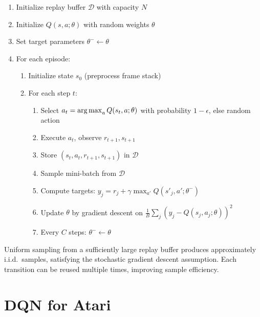 \begin{algorithme}[title=\textbf{DQN Algorithm}]
\begin{enumerate}
    \item Initialize replay buffer $\mathcal{D}$ with capacity $N$
    \item Initialize $Q(s,a;\theta)$ with random weights $\theta$
    \item Set target parameters $\theta^- \leftarrow \theta$
    \item For each episode:
    \begin{enumerate}
        \item Initialize state $s_0$ (preprocess frame stack)
        \item For each step $t$:
        \begin{enumerate}
            \item Select $a_t = \operatorname*{arg\,max}_a Q(s_t, a; \theta)$ with probability
                  $1-\epsilon$, else random action
            \item Execute $a_t$, observe $r_{t+1}, s_{t+1}$
            \item Store $(s_t, a_t, r_{t+1}, s_{t+1})$ in $\mathcal{D}$
            \item Sample mini-batch from $\mathcal{D}$
            \item Compute targets: $y_j = r_j + \gamma \max_{a'} Q(s'_j, a'; \theta^-)$
            \item Update $\theta$ by gradient descent on
                  $\frac{1}{B}\sum_j (y_j - Q(s_j, a_j; \theta))^2$
            \item Every $C$ steps: $\theta^- \leftarrow \theta$
        \end{enumerate}
    \end{enumerate}
\end{enumerate}
\end{algorithme}

\begin{theorem}
Uniform sampling from a sufficiently large replay buffer produces
approximately i.i.d.\ samples, satisfying the stochastic gradient
descent assumption. Each transition can be reused multiple times,
improving sample efficiency.
\end{theorem}

\section{DQN for Atari}
\label{sec:dqn:atari}

